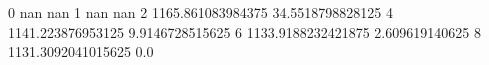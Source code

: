 0 nan nan
1 nan nan
2 1165.861083984375 34.5518798828125
4 1141.223876953125 9.9146728515625
6 1133.9188232421875 2.609619140625
8 1131.3092041015625 0.0
